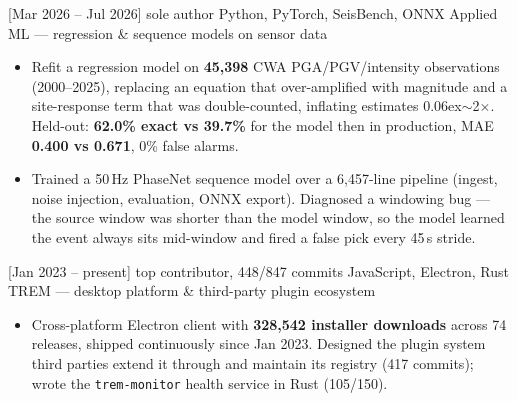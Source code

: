 \documentclass{resume}
\begin{document}
\begin{projects}
  \project%
    {}[Mar 2026 -- Jul 2026]%
    {sole author}%
    {Python, PyTorch, SeisBench, ONNX}%
    {Applied ML --- regression \& sequence models on sensor data}%
    {\begin{itemize}
      \item Refit a regression model on \textbf{45,398} CWA PGA/PGV/intensity observations
        (2000--2025), replacing an equation that over-amplified with magnitude and a site-response
        term that was double-counted, inflating estimates {\raise0.06ex\hbox{$\sim$}}2$\times$. Held-out:
        \textbf{62.0\% exact vs 39.7\%} for the model then in production, MAE
        \textbf{0.400 vs 0.671}, 0\% false alarms.
      \item Trained a 50\,Hz PhaseNet sequence model over a 6,457-line pipeline (ingest, noise
        injection, evaluation, ONNX export). Diagnosed a windowing bug --- the source window was
        shorter than the model window, so the model learned the event always sits mid-window and
        fired a false pick every 45\,s stride.
    \end{itemize}}

  \separator{0.7em}

  \project%
    {}[Jan 2023 -- present]%
    {top contributor, 448/847 commits}%
    {JavaScript, Electron, Rust}%
    {TREM --- desktop platform \& third-party plugin ecosystem}%
    {\begin{itemize}
      \item Cross-platform Electron client with \textbf{328,542 installer downloads} across 74
        releases, shipped continuously since Jan 2023. Designed the plugin system third parties
        extend it through and maintain its registry (417 commits); wrote the
        \texttt{trem-monitor} health service in Rust (105/150).
    \end{itemize}}
\end{projects}
\end{document}
